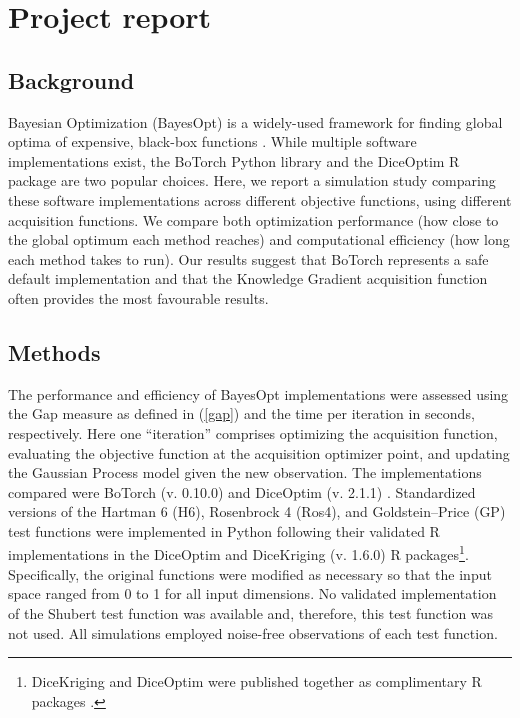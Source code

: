 

\section{Project report}
\subsection{Background}
Bayesian Optimization (BayesOpt) is a widely-used framework for finding global optima of expensive, black-box functions \cite{Jones1998, Frazier2018, Garnett2023}. While multiple software implementations exist, the BoTorch Python library \cite{Balandat2019} and the DiceOptim R package \cite{Roustant2012} are two popular choices. Here, we report a simulation study comparing these software implementations across different objective functions, using different acquisition functions. We compare both optimization performance (how close to the global optimum each method reaches) and computational efficiency (how long each method takes to run). Our results suggest that BoTorch represents a safe default implementation and that the Knowledge Gradient acquisition function often provides the most favourable results.

\subsection{Methods}
The performance and efficiency of BayesOpt implementations were assessed using the Gap measure as defined in (\ref{gap}) and the time per iteration in seconds, respectively. Here one ``iteration'' comprises optimizing the acquisition function, evaluating the objective function at the acquisition optimizer point, and updating the Gaussian Process model given the new observation. The implementations compared were BoTorch (v. 0.10.0) and DiceOptim (v. 2.1.1) \cite{Roustant2012, Balandat2019}. Standardized versions of the Hartman 6 (H6), Rosenbrock 4 (Ros4), and Goldstein–Price (GP) test functions were implemented in Python following their validated R implementations in the DiceOptim and DiceKriging (v. 1.6.0) R packages\footnote{DiceKriging and DiceOptim were published together as complimentary R packages \cite{Roustant2012}.}. Specifically, the original functions were modified as necessary so that the input space ranged from 0 to 1 for all input dimensions. No validated implementation of the Shubert test function was available and, therefore, this test function was not used. All simulations employed noise-free observations of each test function.

